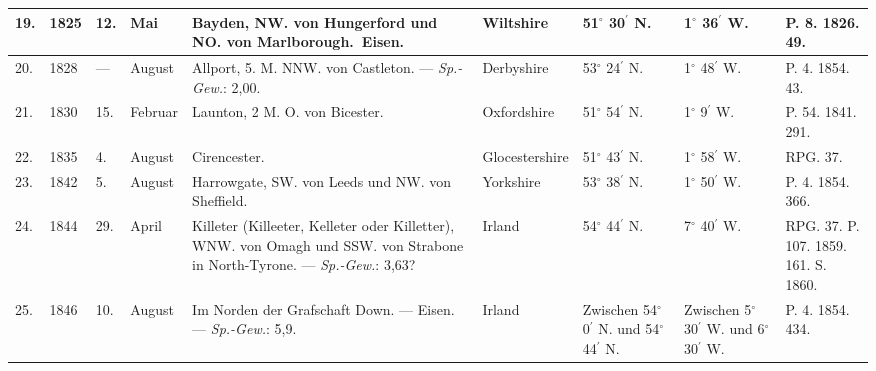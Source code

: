 \documentclass[a4paper, 8pt, oneside, polutonikogreek, german]{article}
\begin{document}
\begin{center}
\begin{longtable}{|p{3mm}|p{7mm}|p{3mm}|p{11mm}|p{30mm}|p{20mm}|p{11mm}|p{11mm}|p{11mm}|}
        19. & 1825 & 12. & Mai & Bayden, NW. von Hungerford und NO. von Marlborough. Eisen. & Wiltshire & 51$^\circ$ 30$^\prime$ N. & 1$^\circ$ 36$^\prime$ W. & P. 8. 1826. 49. \\ \hline
        20. & 1828 & --- & August & Allport, 5. M. NNW. von Castleton. --- \emph{Sp.-Gew.}: 2,00. & Derbyshire & 53$^\circ$ 24$^\prime$ N. & 1$^\circ$ 48$^\prime$ W. & P. 4. 1854. 43. \\ \hline
        21. & 1830 & 15. & Februar & Launton, 2 M. O. von Bicester. & Oxfordshire & 51$^\circ$ 54$^\prime$ N. & 1$^\circ$ 9$^\prime$ W. & P. 54. 1841. 291. \\ \hline
        22. & 1835 & 4. & August & Cirencester. & Glocestershire & 51$^\circ$ 43$^\prime$ N. & 1$^\circ$ 58$^\prime$ W. & RPG. 37. \\ \hline
        23. & 1842 & 5. & August & Harrowgate, SW. von Leeds und NW. von Sheffield. & Yorkshire & 53$^\circ$ 38$^\prime$ N. & 1$^\circ$ 50$^\prime$ W. & P. 4. 1854. 366. \\ \hline
        24. & 1844 & 29. & April & Killeter (Killeeter, Kelleter oder Killetter), WNW. von Omagh und SSW. von Strabone in North-Tyrone. --- \emph{Sp.-Gew.}: 3,63? & Irland & 54$^\circ$ 44$^\prime$ N. & 7$^\circ$ 40$^\prime$ W. & RPG. 37. P. 107. 1859. 161. S. 1860. \\ \hline
        25. & 1846 & 10. & August & Im Norden der Grafschaft Down. --- Eisen. --- \emph{Sp.-Gew.}: 5,9. & Irland & Zwischen 54$^\circ$ 0$^\prime$ N. und 54$^\circ$ 44$^\prime$ N. & Zwischen 5$^\circ$ 30$^\prime$ W. und 6$^\circ$ 30$^\prime$ W. & P. 4. 1854. 434. \\ \hline
    \end{longtable}
\end{center}
\end{document}
